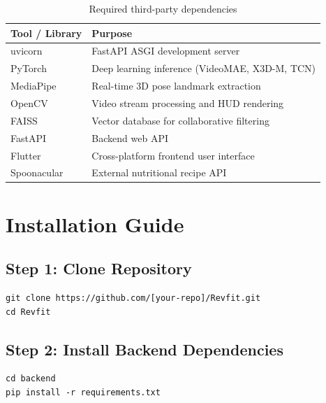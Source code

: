 \normalsize

\begin{table}[H]
\centering
\begin{tabular}{|l|l|}
\hline
\textbf{Tool / Library} & \textbf{Purpose} \\
\hline
uvicorn       & FastAPI ASGI development server \\
PyTorch       & Deep learning inference (VideoMAE, X3D-M, TCN) \\
MediaPipe     & Real-time 3D pose landmark extraction \\
OpenCV        & Video stream processing and HUD rendering \\
FAISS         & Vector database for collaborative filtering \\
FastAPI       & Backend web API \\
Flutter       & Cross-platform frontend user interface \\
Spoonacular   & External nutritional recipe API \\
\hline
\end{tabular}
\caption{Required third-party dependencies}
\label{tab:tools}
\end{table}

\section{Installation Guide}
\label{sec:installation}

\subsection*{Step 1: Clone Repository}

\begin{codebox}
\begin{verbatim}
git clone https://github.com/[your-repo]/Revfit.git
cd Revfit
\end{verbatim}
\end{codebox}

\subsection*{Step 2: Install Backend Dependencies}

\begin{codebox}
\begin{verbatim}
cd backend
pip install -r requirements.txt
\end{verbatim}
\end{codebox}

